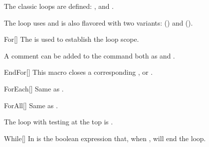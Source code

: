 \documentclass[a4paper, 11pt]{article}
\begin{document}
The classic loops are defined: ,  and .

The  loop uses  and is also flavored with two variants:  () and  ().

\begin{macro}{For}[]
    The  is used to establish the loop scope.

    A comment can be added to the command both as  and .

    \BlockOptions
\end{macro}

\begin{macro}{EndFor}[]
    This macro closes a corresponding ,  or .

    \StatementOptions
\end{macro}

\begin{macro}{ForEach}[]
    Same as .
\end{macro}

\begin{macro}{ForAll}[]
    Same as .
\end{macro}

\begin{tcblisting}{}
    \begin{algorithmic}
        \EndFor
        \EndFor
        \EndFor
    \end{algorithmic}
\end{tcblisting}

The loop with testing at the top is .

\begin{macro}{While}[]
    In  is the boolean expression that, when \False, will end the loop.

    \BlockOptions
\end{macro}
\end{document}
